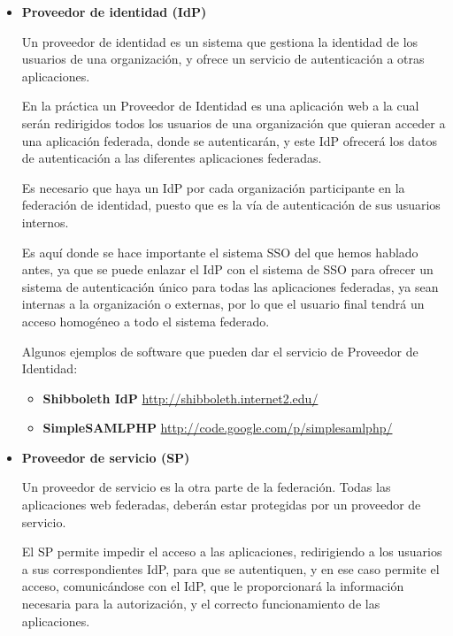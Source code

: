 \begin{itemize}
            \item \textbf{Proveedor de identidad (IdP)}

    Un proveedor de identidad es un sistema que gestiona la identidad
    de los usuarios de una organización, y ofrece un servicio de
    autenticación a otras aplicaciones.

    En la práctica un Proveedor de Identidad es una aplicación web a
    la cual serán redirigidos todos los usuarios de una organización
    que quieran acceder a una aplicación federada, donde se
    autenticarán, y este IdP ofrecerá los datos de autenticación a las
    diferentes aplicaciones federadas.

    Es necesario que haya un IdP por cada organización participante en
    la federación de identidad, puesto que es la vía de autenticación
    de sus usuarios internos.

    Es aquí donde se hace importante el sistema SSO del que hemos
    hablado antes, ya que se puede enlazar el IdP con el sistema de
    SSO para ofrecer un sistema de autenticación único para todas las
    aplicaciones federadas, ya sean internas a la organización o
    externas, por lo que el usuario final tendrá un acceso homogéneo a
    todo el sistema federado.

    Algunos ejemplos de software que pueden dar el servicio de Proveedor
    de Identidad:
    \begin{itemize}
        \item \textbf{Shibboleth IdP}
        \href{http://shibboleth.internet2.edu/}{http://shibboleth.internet2.edu/}
        \item \textbf{SimpleSAMLPHP}
        \href{http://code.google.com/p/simplesamlphp/}{http://code.google.com/p/simplesamlphp/}
    \end{itemize}

            \item \textbf{Proveedor de servicio (SP)}

    Un proveedor de servicio es la otra parte de la federación. Todas
    las aplicaciones web federadas, deberán estar protegidas por un
    proveedor de servicio.

    El SP permite impedir el acceso a las aplicaciones, redirigiendo a
    los usuarios a sus correspondientes IdP, para que se autentiquen,
    y en ese caso permite el acceso, comunicándose con el IdP, que le
    proporcionará la información necesaria para la autorización, y el
    correcto funcionamiento de las aplicaciones.


\end{itemize}
